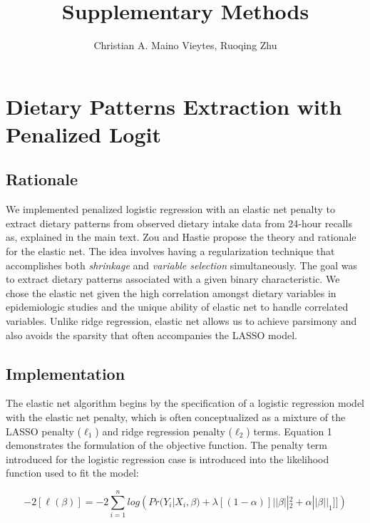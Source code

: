 \documentclass{article}
\title{Supplementary Methods}
\author{Christian A. Maino Vieytes, Ruoqing Zhu}
\date{}
\begin{document}
\maketitle
{}

\tableofcontents


\section{Dietary Patterns Extraction with Penalized Logit}
\subsection{Rationale}
\hspace{\parindent} We implemented penalized logistic regression with an elastic net penalty to extract dietary patterns from observed dietary intake data from 24-hour recalls as, explained in the main text. Zou and Hastie propose the theory and rationale for the elastic net. \supercite{zou2005regularization} The idea involves having a regularization technique that accomplishes both \textit{shrinkage} and \textit{variable selection} simultaneously. The goal was to extract dietary patterns associated with a given binary characteristic. We chose the elastic net given the high correlation amongst dietary variables in epidemiologic studies and the unique ability of elastic net to handle correlated variables. Unlike ridge regression, elastic net allows us to achieve parsimony and also avoids the sparsity that often accompanies the LASSO model.\supercite{zou2005regularization}

\subsection{Implementation}
 \hspace{\parindent}The elastic net algorithm begins by the specification of a logistic regression model with the elastic net penalty, which is often conceptualized as a mixture of the LASSO penalty ($\ell_1$) and ridge regression penalty ($\ell_2$)  terms. Equation 1 demonstrates the formulation of the objective function. The penalty term introduced for the logistic regression case is introduced into the likelihood function used to fit the model:

\begin{equation}
	-2[\ell(\beta)]=-2\sum_{i=1}^nlog({Pr(Y_i|X_i,\beta)+\lambda[(1-\alpha)]||\beta||_2^2+\alpha||\beta||_1]]}) \tag{1}
\end{equation}
\end{document}

